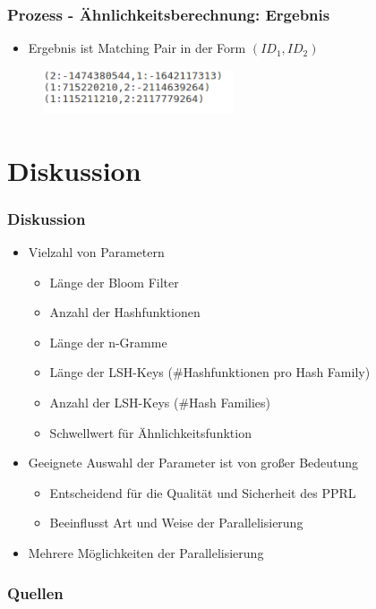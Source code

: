 \documentclass{beamer}
\begin{document}
    \begin{frame}
    		\frametitle{Prozess - Ähnlichkeitsberechnung: Ergebnis}
    		\begin{itemize}
    			\item Ergebnis ist Matching Pair in der Form $(ID_1, ID_2)$
    		\end{itemize}
    		\begin{figure}[H]
    			\includegraphics[width=0.5\textwidth]{graphics/endresult.png}
    		\end{figure}
    \end{frame}
    
    \section[Section]{Diskussion}
    
    \begin{frame}
    		\frametitle{Diskussion}
    		\begin{itemize}
    			\item Vielzahl von Parametern
    			\begin{itemize}
    				\item Länge der Bloom Filter
    				\item Anzahl der Hashfunktionen
    				\item Länge der n-Gramme
    				\item Länge der LSH-Keys (\#Hashfunktionen pro Hash Family)
    				\item Anzahl der LSH-Keys (\#Hash Families)
    				\item Schwellwert für Ähnlichkeitsfunktion
    			\end{itemize}
    			\item Geeignete Auswahl der Parameter ist von großer Bedeutung
    			\begin{itemize}
    				\item Entscheidend für die Qualität und Sicherheit des PPRL
    				\item Beeinflusst Art und Weise der Parallelisierung
    			\end{itemize}
    			\item Mehrere Möglichkeiten der Parallelisierung
    		\end{itemize}
    \end{frame}
     
     \begin{frame}
     	\frametitle{Quellen}
      	
      	
	\end{frame}
     
\end{document}

